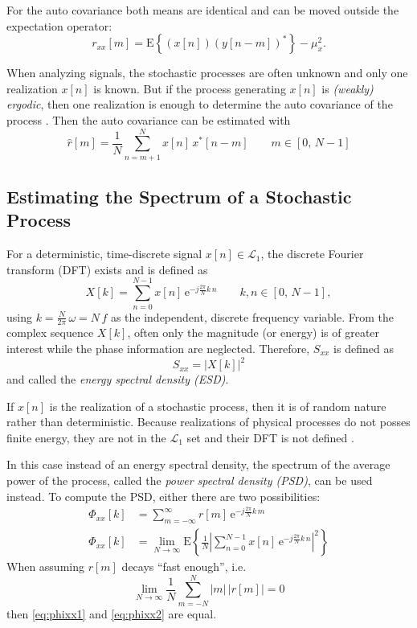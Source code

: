 For the auto covariance both means are identical and can be moved outside the expectation operator:
\begin{equation}
r_{xx}[m] = \text{E}\left\{(x[n])(y[n-m])^\ast\right\}-\mu_{x}^2.
\end{equation}

When analyzing signals, the stochastic processes are often unknown and only one realization $x[n]$ is known. But if the process generating $x[n]$ is \textit{(weakly) ergodic}, then one realization is enough to determine the auto covariance of the process \cite[p.~252]{Puente2019}.
Then the auto covariance can be estimated with
\begin{equation}\label{eq:autocovarianveEstimation}
\hat{r}[m] = \frac{1}{N} \sum_{n=m+1}^{N} x[n]\,x^\ast[n-m]\qquad m \in [0,\,N-1]
\end{equation} 


\subsection{Estimating the Spectrum of a Stochastic Process}
For a deterministic, time-discrete signal $x[n] \in \mathcal{L}_1$, the discrete Fourier transform (DFT) exists\cite{Lapidoth2019} and is defined as
\begin{equation}
X[k] = \sum_{n=0}^{N-1} x[n]\,\text{e}^{-j\frac{2\pi}{N}k\,n}\qquad k,n \in [0,\,N-1],
\end{equation}
using $k=\frac{N}{2\pi}\,\omega = N\,f$ as the independent, discrete frequency variable. 
From the complex sequence $X[k]$, often only the magnitude (or energy) is of greater interest while the phase information are neglected. 
Therefore, $S_{xx}$ is defined as
\begin{equation}
S_{xx} = \left|X[k]\right|^2
\end{equation}
and called the \textit{energy spectral density (ESD)}.

If $x[n]$ is the realization of a stochastic process, then it is of random nature rather than deterministic.
Because realizations of physical processes do not posses finite energy, they are not in the $\mathcal{L}_1$ set and their DFT is not defined \cite[p.~5]{Stoica1997}.

In this case instead of an energy spectral density, the spectrum of the average power of the process, called the \textit{power spectral density (PSD)}, can be used instead.
To compute the PSD, either there are two possibilities:
\begin{align}
\Phi_{xx}[k] &= \sum_{m=-\infty}^{\infty} r[m]\,\text{e}^{-j\frac{2\pi}{N}k\,m} \label{eq:phixx1}\\
\Phi_{xx}[k] &= \lim_{N\rightarrow\infty} \text{E}\left\{\frac{1}{N}\left|\sum_{n=0}^{N-1} x[n]\,\text{e}^{-j\frac{2\pi}{N}k\,n}\right|^2 \right\} \label{eq:phixx2}
\end{align}
When assuming $r[m]$ decays ``fast enough'', i.e.
\begin{equation}
\lim_{N\rightarrow\infty} \frac{1}{N} \sum_{m=-N}^{N} |m|\,\left|r[m]\right| = 0
\end{equation}
then \autoref{eq:phixx1} and \autoref{eq:phixx2} are equal\cite[p.~7]{Stoica1997}.

